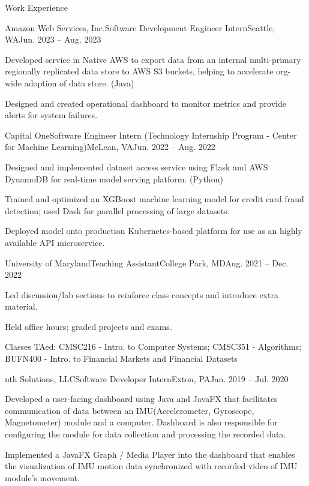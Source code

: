 \documentclass{article}
\newlength{\tabin}
\newlength{\secsep}
\newcommand{\lineunder}{\vspace*{-8pt} \\ \hspace*{-6pt} \hrulefill \\ \vspace*{-15pt}}
\newenvironment{tabbedsection}[1]{
  \begin{list}{}{
      \setlength{\itemsep}{0pt}
      \setlength{\labelsep}{0pt}
      \setlength{\labelwidth}{0pt}
      \setlength{\leftmargin}{\tabin}
      \setlength{\rightmargin}{\tabin}
      \setlength{\listparindent}{0pt}
      \setlength{\parsep}{0pt}
      \setlength{\parskip}{0pt}
      \setlength{\partopsep}{0pt}
      \setlength{\topsep}{#1}
    }
  \item[]
}{\end{list}}
\newenvironment{resume_section}[1]{
  \filbreak
  \vspace{2\secsep}
  \textsc{\large#1}
  \lineunder
  \begin{tabbedsection}{\secsep}
}{\end{tabbedsection}}
\newenvironment{subitems}{
  \renewcommand{\labelitemi}{-}
  \begin{itemize}
      \setlength{\labelsep}{1em}
}{\end{itemize}}
\newenvironment{resume_employer}[4]{
  \vspace{\secsep}
  \textbf{#1} \\ 
  \indent {\small #2} \hfill {\footnotesize#3 (#4)} \hspace{-4em}
  \begin{tabbedsection}{0pt}
  \begin{subitems}
}{\end{subitems}\end{tabbedsection}}
\begin{document}
\begin{resume_section}{Work Experience}
\begin{resume_employer}{Amazon Web Services, Inc.}{Software Development Engineer Intern}{Seattle, WA}{Jun. 2023 -- Aug. 2023}
	\item Developed service in Native AWS to export data from an internal multi-primary regionally replicated data store to
	AWS S3 buckets, helping to accelerate org-wide adoption of data store. (Java)
  \item Designed and created operational dashboard to monitor metrics and provide alerts for system failures.
\end{resume_employer}
\begin{resume_employer}{Capital One}{Software Engineer Intern (Technology Internship Program - Center for Machine Learning)}{McLean, VA}{Jun. 2022 -- Aug. 2022}
	\item Designed and implemented dataset access service using Flask and AWS DynamoDB for real-time model serving platform. (Python)
	\item Trained and optimized an XGBoost machine learning model for credit card fraud detection; used Dask for parallel processing of large datasets. 
	\item Deployed model onto production Kubernetes-based platform for use as an highly available API microservice.
\end{resume_employer}
\begin{resume_employer}{University of Maryland}{Teaching Assistant}{College Park, MD}{Aug. 2021 -- Dec. 2022}
  \item Led discussion/lab sections to reinforce class concepts and introduce extra material.
  \item Held office hours; graded projects and exams.
	\item Classes TAed: CMSC216 - Intro. to Computer Systems; CMSC351 - Algorithms; BUFN400 - Intro. to Financial Markets and Financial Datasets
  
\end{resume_employer}
  \begin{resume_employer}{nth Solutions, LLC}{Software Developer Intern}{Exton, PA}{Jan. 2019 -- Jul. 2020}
    \item Developed a user-facing dashboard using Java and JavaFX that facilitates communication of data between an IMU(Accelerometer, Gyroscope, Magnetometer) module and a computer. Dashboard is also responsible for configuring the module for data collection and processing the recorded data.
    \item Implemented a JavaFX Graph / Media Player into the dashboard that enables the visualization of IMU motion data synchronized with recorded video of IMU module's movement.
  \end{resume_employer}
  
\end{resume_section}
\end{document}

